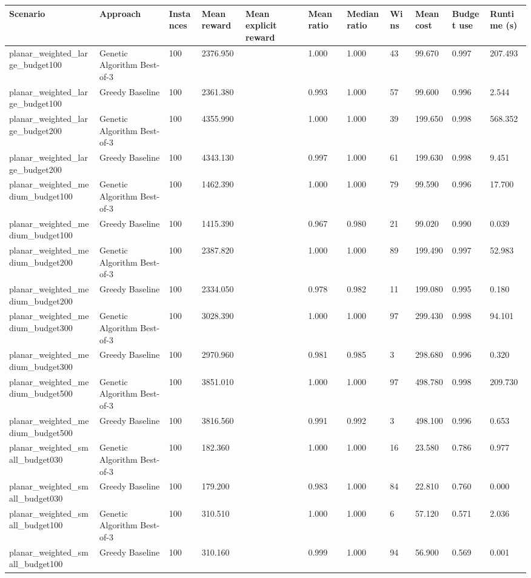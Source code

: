 \begin{tabular}{lllllllllll}
\toprule
Scenario & Approach & Instances & Mean reward & Mean explicit reward & Mean ratio & Median ratio & Wins & Mean cost & Budget use & Runtime (s) \\
\midrule
planar\_weighted\_large\_budget100 & Genetic Algorithm Best-of-3 & 100 & 2376.950 &  & 1.000 & 1.000 & 43 & 99.670 & 0.997 & 207.493 \\
planar\_weighted\_large\_budget100 & Greedy Baseline & 100 & 2361.380 &  & 0.993 & 1.000 & 57 & 99.600 & 0.996 & 2.544 \\
planar\_weighted\_large\_budget200 & Genetic Algorithm Best-of-3 & 100 & 4355.990 &  & 1.000 & 1.000 & 39 & 199.650 & 0.998 & 568.352 \\
planar\_weighted\_large\_budget200 & Greedy Baseline & 100 & 4343.130 &  & 0.997 & 1.000 & 61 & 199.630 & 0.998 & 9.451 \\
planar\_weighted\_medium\_budget100 & Genetic Algorithm Best-of-3 & 100 & 1462.390 &  & 1.000 & 1.000 & 79 & 99.590 & 0.996 & 17.700 \\
planar\_weighted\_medium\_budget100 & Greedy Baseline & 100 & 1415.390 &  & 0.967 & 0.980 & 21 & 99.020 & 0.990 & 0.039 \\
planar\_weighted\_medium\_budget200 & Genetic Algorithm Best-of-3 & 100 & 2387.820 &  & 1.000 & 1.000 & 89 & 199.490 & 0.997 & 52.983 \\
planar\_weighted\_medium\_budget200 & Greedy Baseline & 100 & 2334.050 &  & 0.978 & 0.982 & 11 & 199.080 & 0.995 & 0.180 \\
planar\_weighted\_medium\_budget300 & Genetic Algorithm Best-of-3 & 100 & 3028.390 &  & 1.000 & 1.000 & 97 & 299.430 & 0.998 & 94.101 \\
planar\_weighted\_medium\_budget300 & Greedy Baseline & 100 & 2970.960 &  & 0.981 & 0.985 & 3 & 298.680 & 0.996 & 0.320 \\
planar\_weighted\_medium\_budget500 & Genetic Algorithm Best-of-3 & 100 & 3851.010 &  & 1.000 & 1.000 & 97 & 498.780 & 0.998 & 209.730 \\
planar\_weighted\_medium\_budget500 & Greedy Baseline & 100 & 3816.560 &  & 0.991 & 0.992 & 3 & 498.100 & 0.996 & 0.653 \\
planar\_weighted\_small\_budget030 & Genetic Algorithm Best-of-3 & 100 & 182.360 &  & 1.000 & 1.000 & 16 & 23.580 & 0.786 & 0.977 \\
planar\_weighted\_small\_budget030 & Greedy Baseline & 100 & 179.200 &  & 0.983 & 1.000 & 84 & 22.810 & 0.760 & 0.000 \\
planar\_weighted\_small\_budget100 & Genetic Algorithm Best-of-3 & 100 & 310.510 &  & 1.000 & 1.000 & 6 & 57.120 & 0.571 & 2.036 \\
planar\_weighted\_small\_budget100 & Greedy Baseline & 100 & 310.160 &  & 0.999 & 1.000 & 94 & 56.900 & 0.569 & 0.001 \\
\bottomrule
\end{tabular}
